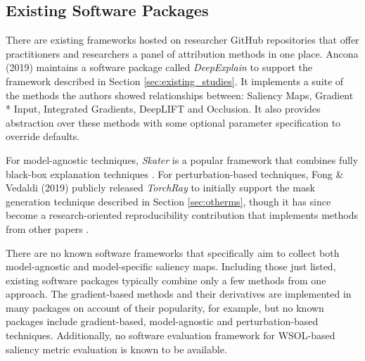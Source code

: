 \documentclass[main]{subfiles}
\begin{document}








\subsection{Existing Software Packages}

There are existing frameworks hosted on researcher GitHub repositories that offer practitioners and researchers a panel of attribution methods in one place. 
Ancona (2019) maintains a software package called \textit{DeepExplain} \cite{deepexplainerrepo} to support the framework described in Section \ref{sec:existing_studies}. It implements a suite of the methods the authors showed relationships between: Saliency Maps, Gradient * Input, Integrated Gradients, DeepLIFT and Occlusion. It also provides abstraction over these methods with some optional parameter specification to override defaults.

For model-agnostic techniques, \textit{Skater} is a popular framework that combines fully black-box explanation techniques \cite{skater}. For perturbation-based techniques, Fong \& Vedaldi (2019) publicly released \textit{TorchRay} to initially support the mask generation technique described in Section \ref{sec:otherms}, though it has since become a research-oriented reproducibility contribution that implements methods from other papers \cite{torchray}.

There are no known software frameworks that specifically aim to collect both model-agnostic and model-specific saliency maps. Including those just listed, existing software packages typically combine only a few methods from one approach. The gradient-based methods and their derivatives are implemented in many packages on account of their popularity, for example, but no known packages include gradient-based, model-agnostic and perturbation-based techniques. Additionally, no software evaluation framework for WSOL-based saliency metric evaluation is known to be available.
\end{document}

